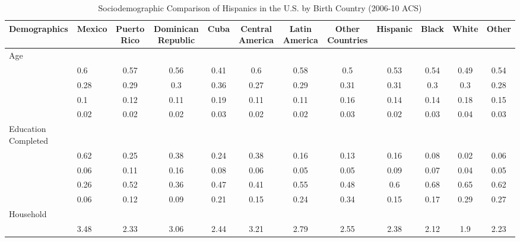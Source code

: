 \documentclass[
]{article}
\begin{document}
\begin{landscape}
\begin{table}[ht]
\centering
\caption{Sociodemographic Comparison of Hispanics in the U.S. by Birth Country (2006-10 ACS)} 
\begingroup\small
\begin{tabular}{>{\raggedright\arraybackslash}p{3.2cm}|lcccccc|cccc}
  \hline
Demographics & Mexico & Puerto Rico & Dominican Republic & Cuba & Central America & Latin America & Other Countries & Hispanic & Black & White & Other \\ 
  \hline
Age &  &  &  &  &  &  &  &  &  &  &  \\ 
  \multicolumn{1}{>{\raggedleft\arraybackslash}p{1.5cm}|}{\makebox[1.5cm][r]{60 - 69 }}& 0.6 & 0.57 & 0.56 & 0.41 & 0.6 & 0.58 & 0.5 & 0.53 & 0.54 & 0.49 & 0.54 \\ 
  \multicolumn{1}{>{\raggedleft\arraybackslash}p{1.5cm}|}{\makebox[1.5cm][r]{70 - 79 }}& 0.28 & 0.29 & 0.3 & 0.36 & 0.27 & 0.29 & 0.31 & 0.31 & 0.3 & 0.3 & 0.28 \\ 
  \multicolumn{1}{>{\raggedleft\arraybackslash}p{1.5cm}|}{\makebox[1.5cm][r]{80 - 89 }}& 0.1 & 0.12 & 0.11 & 0.19 & 0.11 & 0.11 & 0.16 & 0.14 & 0.14 & 0.18 & 0.15 \\ 
  \multicolumn{1}{>{\raggedleft\arraybackslash}p{1.5cm}|}{\makebox[1.5cm][r]{90 plus }}& 0.02 & 0.02 & 0.02 & 0.03 & 0.02 & 0.02 & 0.03 & 0.02 & 0.03 & 0.04 & 0.03 \\ 
  Education Completed &  &  &  &  &  &  &  &  &  &  &  \\ 
  \multicolumn{1}{>{\raggedleft\arraybackslash}p{3.2cm}|}{\makebox[3.2cm][r]{Less than Primary }}& 0.62 & 0.25 & 0.38 & 0.24 & 0.38 & 0.16 & 0.13 & 0.16 & 0.08 & 0.02 & 0.06 \\ 
  \multicolumn{1}{>{\raggedleft\arraybackslash}p{1.7cm}|}{\makebox[1.7cm][r]{Primary }}& 0.06 & 0.11 & 0.16 & 0.08 & 0.06 & 0.05 & 0.05 & 0.09 & 0.07 & 0.04 & 0.05 \\ 
  \multicolumn{1}{>{\raggedleft\arraybackslash}p{2cm}|}{\makebox[2cm][r]{Secondary }}& 0.26 & 0.52 & 0.36 & 0.47 & 0.41 & 0.55 & 0.48 & 0.6 & 0.68 & 0.65 & 0.62 \\ 
  \multicolumn{1}{>{\raggedleft\arraybackslash}p{2cm}|}{\makebox[2cm][r]{University }}& 0.06 & 0.12 & 0.09 & 0.21 & 0.15 & 0.24 & 0.34 & 0.15 & 0.17 & 0.29 & 0.27 \\ 
  Household &  &  &  &  &  &  &  &  &  &  &  \\ 
  \multicolumn{1}{>{\raggedleft\arraybackslash}p{2.7cm}|}{\makebox[2.7cm][r]{Household Size }}& 3.48 & 2.33 & 3.06 & 2.44 & 3.21 & 2.79 & 2.55 & 2.38 & 2.12 & 1.9 & 2.23 \\ 

\end{tabular}
\end{table}
\end{landscape}
\end{document}
